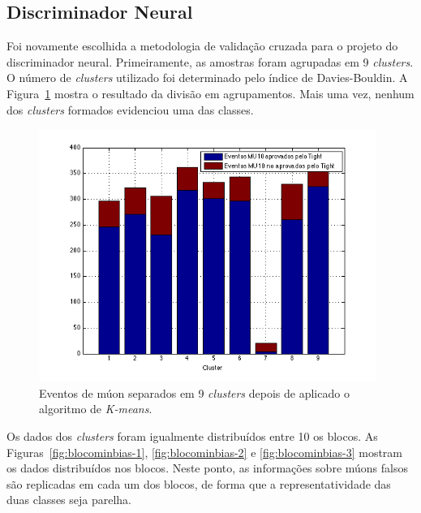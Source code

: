 \subsection*{Discriminador Neural}

Foi novamente escolhida a metodologia de validação cruzada para o projeto do
discriminador neural. Primeiramente, as amostras foram agrupadas em 9
\emph{clusters}. O número de \emph{clusters} utilizado foi determinado pelo
índice de Davies-Bouldin. A Figura~\ref{fig:clustersminbias} mostra o resultado da
divisão em agrupamentos. Mais uma vez, nenhum dos \emph{clusters} formados
evidenciou uma das classes.

\begin{figure}[htpb!]
    \centering
    \includegraphics[width=11cm]{images/minbias/kmeans_cluster.png}
    \caption{Eventos de múon separados em 9 \emph{clusters} depois de aplicado
    o algoritmo de \emph{K-means}.}
    \label{fig:clustersminbias}
\end{figure}

Os dados dos \emph{clusters} foram igualmente distribuídos entre 10 os blocos.
As Figuras~\ref{fig:blocominbias-1}, \ref{fig:blocominbias-2} e
\ref{fig:blocominbias-3} mostram os dados distribuídos nos blocos. Neste ponto,
as informações sobre múons falsos são replicadas em cada um dos blocos, de forma
que a representatividade das duas classes seja parelha.


